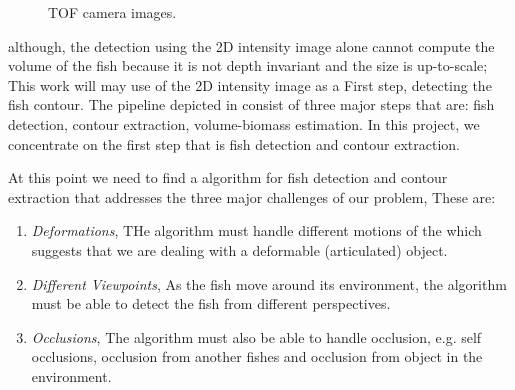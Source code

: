\begin{figure}[h]
\centering
{}
{}%
\caption{TOF camera images.}
\label{fig:tofNoisy}
\end{figure}

although, the detection using the 2D intensity image alone cannot compute the volume
of the fish because it is not depth invariant and the size is up-to-scale; This work 
will may use of the 2D intensity image as a First step, detecting the fish contour.
The pipeline depicted in  consist of three major steps
that are: fish detection, contour extraction, volume-biomass estimation. In this 
project, we concentrate on the first step that is fish detection and contour extraction.

At this point we need to find a algorithm for fish detection and contour extraction 
that addresses the three major challenges of our problem, These are:

\begin{enumerate}
\item \textit{Deformations}, THe algorithm must handle different motions of the
which suggests that we are dealing with a deformable (articulated) object.
\item \textit{Different Viewpoints}, As the fish move around its environment, the 
algorithm must be able to detect the fish from different perspectives.
\item \textit{Occlusions}, The algorithm must also be able to handle occlusion, 
e.g. self occlusions, occlusion from another fishes and occlusion from object in 
the environment.
\end{enumerate}

